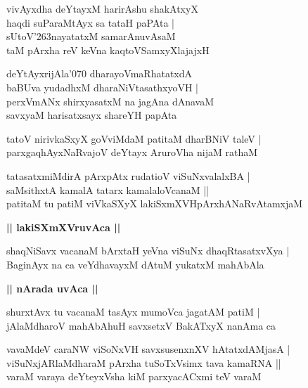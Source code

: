 \documentclass[twoside,12pt,openright]{book}
\def\S{\char'263}
\newcounter{shloka}[chapter]
\def\uvaca#1{\centerline{{\large\textbf{#1}}}}
\begin{document}
\begin{shloka}%
vivAyxdha deYtayxM harirAshu shakAtxyX \\
haqdi suParaMtAyx sa tataH paPAta |\\
sUtoV\S nayatatxM samarAnuvAsaM \\
taM pArxha reV keVna kaqtoVSamxyXlajajxH 
\end{shloka}

\begin{shloka}%
deYtAyxrijAla\char'070 dharayoVmaRhatatxdA\\
baBUva yudadhxM dharaNiVtasathxyoVH |\\
perxVmANx shirxyasatxM na jagAna dAnavaM \\
savxyaM harisatxsayx shareYH papAta
\end{shloka}

\begin{shloka}%
tatoV nirivkaSxyX goVviMdaM patitaM dharBNiV taleV |\\
parxgaqhAyxNaRvajoV deYtayx AruroVha nijaM rathaM 
\end{shloka}

\begin{shloka}%
tatasatxmiMdirA pArxpAtx rudatioV viSuNxvalalxBA |\\
saMsithxtA kamalA tatarx kamalaloVcanaM ||\\
patitaM tu patiM viVkaSXyX lakiSxmXVHpArxhANaRvAtamxjaM 
\end{shloka}

\uvaca{|| lakiSXmXVruvAca ||}

\begin{shloka}%
shaqNiSavx  vacanaM bArxtaH yeVna viSuNx dhaqRtasatxvXya |\\
BaginAyx na ca veYdhavayxM dAtuM yukatxM mahAbAla 
\end{shloka}

\uvaca{|| nArada uvAca ||}

\begin{shloka}%
shurxtAvx tu vacanaM tasAyx mumoVca jagatAM patiM |\\
jAlaMdharoV mahAbAhuH savxsetxV BakATxyX nanAma ca 
\end{shloka}

\begin{shloka}%
vavaMdeV caraNW viSoNxVH savxsusenxnXV hAtatxdAMjasA |\\
viSuNxjARlaMdharaM pArxha tuSoTxVsimx tava kamaRNA ||\\
varaM varaya deYteyxVsha kiM parxyacACxmi teV varaM
\end{shloka}
\end{document}
